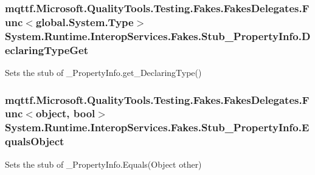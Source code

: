 \hypertarget{class_system_1_1_runtime_1_1_interop_services_1_1_fakes_1_1_stub___property_info_a512de1bf6adf323df8dc4621c3047f75}{
\subsubsection[{Declaring\-Type\-Get}]{\setlength{\rightskip}{0pt plus 5cm}mqttf.\-Microsoft.\-Quality\-Tools.\-Testing.\-Fakes.\-Fakes\-Delegates.\-Func$<$global.\-System.\-Type$>$ System.\-Runtime.\-Interop\-Services.\-Fakes.\-Stub\-\_\-\-Property\-Info.\-Declaring\-Type\-Get}}\label{class_system_1_1_runtime_1_1_interop_services_1_1_fakes_1_1_stub___property_info_a512de1bf6adf323df8dc4621c3047f75}


Sets the stub of \-\_\-\-Property\-Info.\-get\-\_\-\-Declaring\-Type()

\hypertarget{class_system_1_1_runtime_1_1_interop_services_1_1_fakes_1_1_stub___property_info_a930478152737dbf83d678f9811b6ddb5}{
\subsubsection[{Equals\-Object}]{\setlength{\rightskip}{0pt plus 5cm}mqttf.\-Microsoft.\-Quality\-Tools.\-Testing.\-Fakes.\-Fakes\-Delegates.\-Func$<$object, bool$>$ System.\-Runtime.\-Interop\-Services.\-Fakes.\-Stub\-\_\-\-Property\-Info.\-Equals\-Object}}\label{class_system_1_1_runtime_1_1_interop_services_1_1_fakes_1_1_stub___property_info_a930478152737dbf83d678f9811b6ddb5}


Sets the stub of \-\_\-\-Property\-Info.\-Equals(\-Object other)

